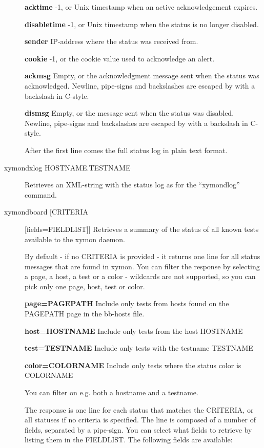 \begin{description}
 \textbf{acktime}
 -1, or Unix timestamp when an active acknowledgement expires. 


 \textbf{disabletime}
 -1, or Unix timestamp when the status is no longer disabled. 


 \textbf{sender}
 IP-address where the status was received from. 


 \textbf{cookie}
 -1, or the cookie value used to acknowledge an alert. 


 \textbf{ackmsg}
 Empty, or the acknowledgment message sent when the status was
 acknowledged. Newline, pipe-signs and backslashes are escaped by with
 a backslash in C-style. 



 \textbf{dismsg}
 Empty, or the message sent when the status was disabled. Newline,
 pipe-signs and backslashes are escaped by with a backslash in
 C-style. 



  After the first line comes the full status log in plain text format. 


 

\item[xymondxlog HOSTNAME.TESTNAME] Retrieves an XML-string with the
  status log as for the ``xymondlog'' command. 


\item[xymondboard [CRITERIA] [fields=FIELDLIST]] Retrieves a summary
  of the status of all known tests available to the xymon daemon. 


  By default - if no CRITERIA is provided - it returns one line for
  all status messages that are found in xymon. You can filter the
  response by selecting a page, a host, a test or a color - wildcards
  are not supported, so you can pick only one page, host, test or
  color. 

 \textbf{page=PAGEPATH}
 Include only tests from hosts found on the PAGEPATH page in the bb-hosts file. 


 \textbf{host=HOSTNAME}
 Include only tests from the host HOSTNAME 


 \textbf{test=TESTNAME}
 Include only tests with the testname TESTNAME 


 \textbf{color=COLORNAME}
 Include only tests where the status color is COLORNAME 


  You can filter on e.g. both a hostname and a testname. 


  The response is one line for each status that matches the CRITERIA,
  or all statuses if no criteria is specified. The line is composed of
  a number of fields, separated by a pipe-sign. You can select what
  fields to retrieve by listing them in the FIELDLIST. The following
  fields are available: 



\end{description}
